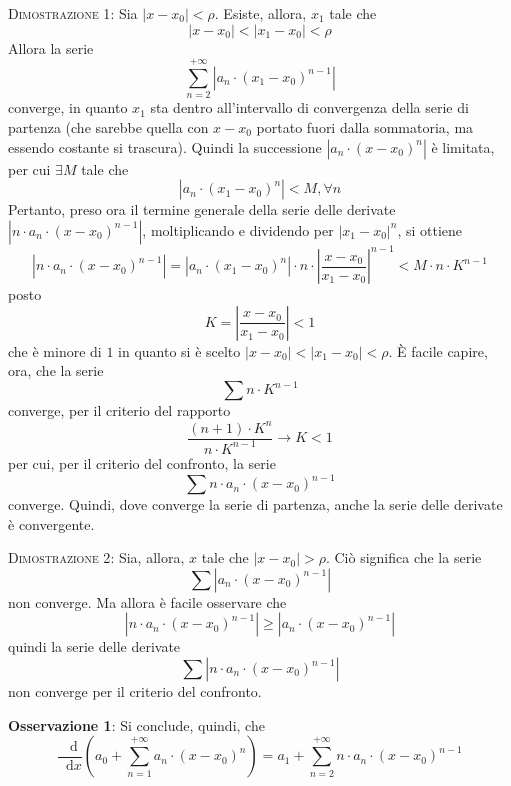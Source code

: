 \documentclass[a4paper]{extarticle}
\newcommand*\dif{\mathop{}\!\mathrm{d}}
\begin{document}
\vspace{2em}
\noindent
\normalfont \normalsize
\textsc{Dimostrazione 1}: Sia $\left \vert x - x_0 \right \vert < \rho$. Esiste, allora, $x_1$ tale che
\[\left \vert x - x_0 \right \vert < \left \vert x_1 - x_0 \right \vert < \rho\]
Allora la serie
\[\sum_{n=2}^{+\infty} \left \vert a_n \cdot (x_1 - x_0)^{n-1} \right \vert\]
converge, in quanto $x_1$ sta dentro all'intervallo di convergenza della serie di partenza (che sarebbe quella con $x-x_0$ portato fuori dalla sommatoria, ma essendo costante si trascura). Quindi la successione $\left \vert a_n \cdot (x-x_0)^n \right \vert$ è limitata, per cui $\exists M$ tale che
\[\left \vert a_n \cdot (x_1-x_0)^n \right \vert < M, \forall n\]
Pertanto, preso ora il termine generale della serie delle derivate $\left \vert n \cdot a_n \cdot (x-x_0)^{n-1} \right \vert$, moltiplicando e dividendo per $\vert x_1-x_0 \vert^n$, si ottiene 
\[\left \vert n \cdot a_n \cdot (x-x_0)^{n-1} \right \vert = \left \vert a_n \cdot (x_1-x_0)^n \right \vert \cdot n \cdot \left \vert \frac{x-x_0}{x_1-x_0} \right \vert^{n-1} < M \cdot n \cdot K^{n-1}\]
posto
\[K=\left \vert \frac{x-x_0}{x_1-x_0} \right \vert < 1\]
che è minore di $1$ in quanto si è scelto $\left \vert x - x_0 \right \vert < \left \vert x_1 - x_0 \right \vert < \rho$. È facile capire, ora, che la serie
\[\sum{n \cdot K^{n-1}}\]
converge, per il criterio del rapporto
\[\frac{(n+1) \cdot K^n}{n \cdot K^{n-1}} \rightarrow K < 1\]
per cui, per il criterio del confronto, la serie
\[\sum n \cdot a_n \cdot (x-x_0)^{n-1}\]
converge. Quindi, dove converge la serie di partenza, anche la serie delle derivate è convergente.

\vspace{2em}
\noindent
\normalfont \normalsize
\textsc{Dimostrazione 2}: Sia, allora, $x$ tale che $\left \vert x - x_0 \right \vert > \rho$. Ciò significa che la serie
\[\sum \left \vert a_n \cdot (x-x_0)^{n-1}\right \vert\]
non converge. Ma allora è facile osservare che
\[\left \vert n \cdot a_n \cdot (x-x_0)^{n-1} \right \vert \geq \left \vert a_n \cdot (x-x_0)^{n-1} \right \vert\]
quindi la serie delle derivate
\[\sum \left \vert n \cdot a_n \cdot (x-x_0)^{n-1} \right \vert\]
non converge per il criterio del confronto.

\vspace{2em}
\noindent
\textbf{Osservazione 1}: Si conclude, quindi, che
\[\frac{\dif}{\dif x} \left(a_0 + \sum_{n=1}^{+\infty} a_n \cdot (x-x_0)^n\right) = a_1 + \sum_{n=2}^{+\infty} n \cdot a_n \cdot (x-x_0)^{n-1}\]
\end{document}
